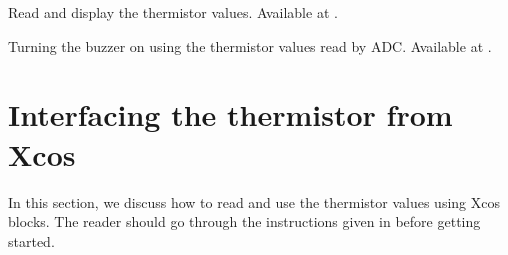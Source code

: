 \begin{scicode}
   {Read and display
    the thermistor values.  Available at
    .}
  \label{sci:therm-read}
  
\end{scicode}

\begin{scicode}
  {Turning the buzzer on using the thermistor values read by
    ADC.  Available at .}
  \label{sci:therm-buzzer}
  
\end{scicode}

\section{Interfacing the thermistor from Xcos}
In this section, we discuss how to read and use the thermistor values using
Xcos blocks. The reader should go
through the instructions given in  before
getting started.

